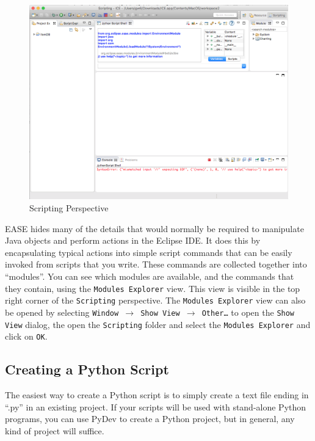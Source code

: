 \begin{figure}[!ht]
\centering
\includegraphics[width=\textwidth]{images/perspective.png}
\caption{Scripting Perspective}
\label{fig:perspective}
\end{figure}

EASE hides many of the details that would normally be required to manipulate
Java objects and perform actions in the Eclipse IDE. It does this by
encapsulating typical actions into simple script commands that can be easily
invoked from scripts that you write. These commands are collected together into
``modules''. You can see which modules are available, and the commands that they
contain, using the \texttt{Modules Explorer} view. This view is visible in
the top right corner of the \texttt{Scripting} perspective. The \texttt{Modules
Explorer} view can also be opened by selecting \texttt{Window $\rightarrow$ Show
View $\rightarrow$ Other\ldots} to open the \texttt{Show View} dialog, the open
the \texttt{Scripting} folder and select the \texttt{Modules Explorer} and click
on \texttt{OK}.

\subsection{Creating a Python Script}

The easiest way to create a Python script is to simply create a text file ending
in ``.py'' in an existing project. If your scripts will be used with stand-alone Python
programs, you can use PyDev to create a Python project, but in general, any kind
of project will suffice.

